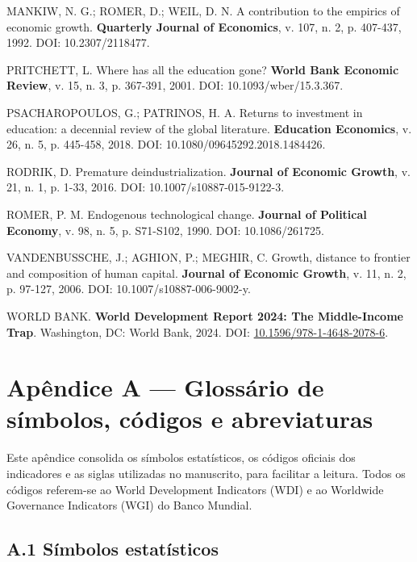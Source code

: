 \documentclass[12pt,a4paper]{article}
\begin{document}
MANKIW, N. G.; ROMER, D.; WEIL, D. N. A contribution to the empirics of economic growth. \textbf{Quarterly Journal of Economics}, v. 107, n. 2, p. 407-437, 1992. DOI: 10.2307/2118477.

PRITCHETT, L. Where has all the education gone? \textbf{World Bank Economic Review}, v. 15, n. 3, p. 367-391, 2001. DOI: 10.1093/wber/15.3.367.

PSACHAROPOULOS, G.; PATRINOS, H. A. Returns to investment in education: a decennial review of the global literature. \textbf{Education Economics}, v. 26, n. 5, p. 445-458, 2018. DOI: 10.1080/09645292.2018.1484426.

RODRIK, D. Premature deindustrialization. \textbf{Journal of Economic Growth}, v. 21, n. 1, p. 1-33, 2016. DOI: 10.1007/s10887-015-9122-3.

ROMER, P. M. Endogenous technological change. \textbf{Journal of Political Economy}, v. 98, n. 5, p. S71-S102, 1990. DOI: 10.1086/261725.

VANDENBUSSCHE, J.; AGHION, P.; MEGHIR, C. Growth, distance to frontier and composition of human capital. \textbf{Journal of Economic Growth}, v. 11, n. 2, p. 97-127, 2006. DOI: 10.1007/s10887-006-9002-y.

WORLD BANK. \textbf{World Development Report 2024: The Middle-Income Trap}. Washington, DC: World Bank, 2024. DOI: \href{https://doi.org/10.1596/978-1-4648-2078-6}{10.1596/978-1-4648-2078-6}.

\appendix
\section*{Apêndice A --- Glossário de símbolos, códigos e abreviaturas}

Este apêndice consolida os símbolos estatísticos, os códigos oficiais dos indicadores e as siglas utilizadas no manuscrito, para facilitar a leitura. Todos os códigos referem-se ao World Development Indicators (WDI) e ao Worldwide Governance Indicators (WGI) do Banco Mundial.

\subsection*{A.1 Símbolos estatísticos}
\end{document}
